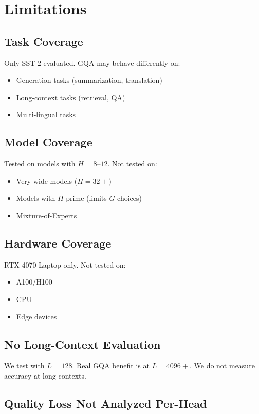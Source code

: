 
\section{Limitations}

\subsection{Task Coverage}

Only SST-2 evaluated. GQA may behave differently on:
\begin{itemize}
\item Generation tasks (summarization, translation)
\item Long-context tasks (retrieval, QA)
\item Multi-lingual tasks

\end{itemize}
\subsection{Model Coverage}

Tested on models with $H = 8$--$12$. Not tested on:
\begin{itemize}
\item Very wide models ($H = 32+$)
\item Models with $H$ prime (limits $G$ choices)
\item Mixture-of-Experts

\end{itemize}
\subsection{Hardware Coverage}

RTX 4070 Laptop only. Not tested on:
\begin{itemize}
\item A100/H100
\item CPU
\item Edge devices

\end{itemize}
\subsection{No Long-Context Evaluation}

We test with $L = 128$. Real GQA benefit is at $L = 4096+$. We do not 
measure accuracy at long contexts.

\subsection{Quality Loss Not Analyzed Per-Head}

